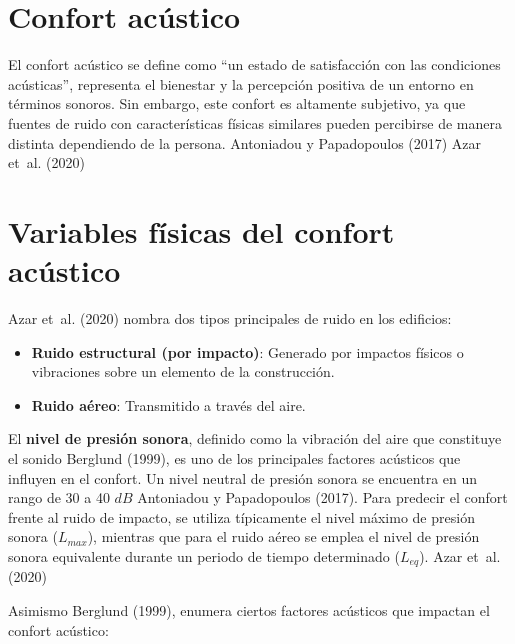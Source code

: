 \documentclass[
  letterpaper,
]{scrbook}
\begin{document}
\section{Confort acústico}\label{confort-acuxfastico}

El confort acústico se define como ``un estado de satisfacción con las
condiciones acústicas'', representa el bienestar y la percepción
positiva de un entorno en términos sonoros. Sin embargo, este confort es
altamente subjetivo, ya que fuentes de ruido con características físicas
similares pueden percibirse de manera distinta dependiendo de la
persona. Antoniadou y Papadopoulos (2017) Azar et~al. (2020)

\section{Variables físicas del confort
acústico}\label{variables-fuxedsicas-del-confort-acuxfastico}

Azar et~al. (2020) nombra dos tipos principales de ruido en los
edificios:

\begin{itemize}
\item
  \textbf{Ruido estructural (por impacto)}: Generado por impactos
  físicos o vibraciones sobre un elemento de la construcción.
\item
  \textbf{Ruido aéreo}: Transmitido a través del aire.
\end{itemize}

El \textbf{nivel de presión sonora}, definido como la vibración del aire
que constituye el sonido Berglund (1999), es uno de los principales
factores acústicos que influyen en el confort. Un nivel neutral de
presión sonora se encuentra en un rango de 30 a 40 \(dB\) Antoniadou y
Papadopoulos (2017). Para predecir el confort frente al ruido de
impacto, se utiliza típicamente el nivel máximo de presión sonora
(\(L_{max}\)), mientras que para el ruido aéreo se emplea el nivel de
presión sonora equivalente durante un periodo de tiempo determinado
(\(L_{eq}\)). Azar et~al. (2020)

Asimismo Berglund (1999), enumera ciertos factores acústicos que
impactan el confort acústico:
\end{document}
